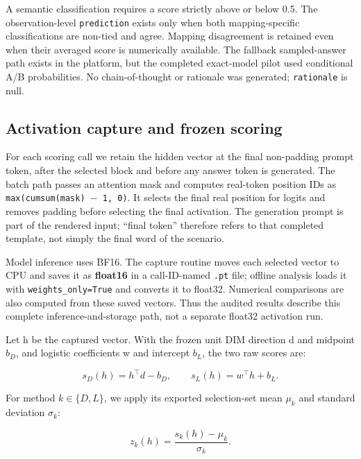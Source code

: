 A semantic classification requires a score strictly above or below 0.5. The observation-level \texttt{prediction} exists only when both mapping-specific classifications are non-tied and agree. Mapping disagreement is retained even when their averaged score is numerically available. The fallback sampled-answer path exists in the platform, but the completed exact-model pilot used conditional A/B probabilities. No chain-of-thought or rationale was generated; \texttt{rationale} is null.

\subsection{Activation capture and frozen scoring}\label{activation-capture-and-frozen-scoring}

For each scoring call we retain the hidden vector at the final non-padding prompt token, after the selected block and before any answer token is generated. The batch path passes an attention mask and computes real-token position IDs as \texttt{max(cumsum(mask)\ \ensuremath{-}\ 1,\ 0)}. It selects the final real position for logits and removes padding before selecting the final activation. The generation prompt is part of the rendered input; ``final token'' therefore refers to that completed template, not simply the final word of the scenario.

Model inference uses BF16. The capture routine moves each selected vector to CPU and saves it as \textbf{float16} in a call-ID-named \texttt{.pt} file; offline analysis loads it with \nolinkurl{weights_only=True} and converts it to float32. Numerical comparisons are also computed from these saved vectors. Thus the audited results describe this complete inference-and-storage path, not a separate float32 activation run.

Let h be the captured vector. With the frozen unit DIM direction d and midpoint \(b_{D}\), and logistic coefficients w and intercept \(b_{L}\), the two raw scores are:

\begin{equation}\label{eq:raw}
s_D(h)=h^\top d-b_D,\qquad s_L(h)=w^\top h+b_L.
\end{equation}

For method \(k\in\{D,L\}\), we apply its exported selection-set mean \(\mu_{k}\) and standard deviation \(\sigma_{k}\):

\begin{equation}\label{eq:scaled}
z_k(h)=\frac{s_k(h)-\mu_k}{\sigma_k}.
\end{equation}

